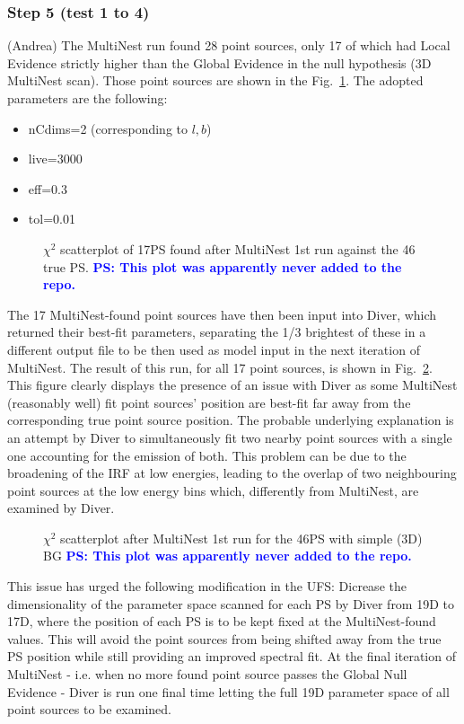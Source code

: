 \documentclass{article}
\newcommand{\ps}[1]{\textcolor{blue}{{\bf PS: #1}}}
\begin{document}
\subsubsection*{Step 5 (test 1 to 4)}
(Andrea) The MultiNest run found 28 point sources, only 17 of which had Local Evidence strictly higher than the Global
Evidence in the null hypothesis (3D MultiNest scan). Those point sources are shown in the Fig.~\ref{fig:17MN}. The adopted parameters are the following:
\begin{itemize}
\item nCdims=2 (corresponding to $l,b$)
\item live=3000
\item eff=0.3
\item tol=0.01
\end{itemize}
\begin{figure}[h]
\centering
\caption{$\chi^{2}$ scatterplot of 17PS found after MultiNest 1st run against the 46 true PS. \ps{This plot was apparently never added to the repo.}}
\label{fig:17MN}
\end{figure}
The 17 MultiNest-found point sources have then been input into Diver, which returned their best-fit parameters, separating
the 1/3 brightest of these in a different output file to be then used as model input in the next iteration of MultiNest. The result
of this run, for all 17 point sources, is shown in Fig.~\ref{fig:6Diver}. This figure clearly displays the presence of an issue with Diver as
some MultiNest (reasonably well) fit point sources' position are best-fit far away from the corresponding true point source position.
The probable underlying explanation is an attempt by Diver to simultaneously fit two nearby point sources with a single one accounting
for the emission of both. This problem can be due to the broadening of the IRF at low energies, leading to the overlap of two
neighbouring point sources at the low energy bins which, differently from MultiNest, are examined by Diver. \newline
\begin{figure}[h]
\centering
\caption{$\chi^{2}$ scatterplot after MultiNest 1st run for the 46PS with simple (3D) BG \ps{This plot was apparently never added to the repo.}}
\label{fig:6Diver}
\end{figure}
This issue has urged the following modification in the UFS: Dicrease the dimensionality of the parameter space scanned for each
PS by Diver from 19D to 17D, where the position of each PS is to be kept fixed at the MultiNest-found values. This will avoid the point
sources from being shifted away from the true PS position while still providing an improved spectral fit. At the final iteration of
MultiNest - i.e. when no more found point source passes the Global Null Evidence - Diver is run one final time letting the full
19D parameter space of all point sources to be examined.
\end{document}
